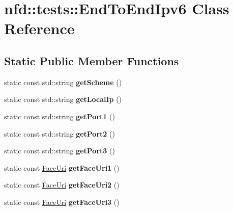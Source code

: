 \hypertarget{classnfd_1_1tests_1_1EndToEndIpv6}{}\section{nfd\+:\+:tests\+:\+:End\+To\+End\+Ipv6 Class Reference}
\label{classnfd_1_1tests_1_1EndToEndIpv6}
\subsection*{Static Public Member Functions}
\begin{DoxyCompactItemize}
\item 
static const std\+::string {\bfseries get\+Scheme} ()\hypertarget{classnfd_1_1tests_1_1EndToEndIpv6_a64fd121887d76d23874ca014762f704a}{}\label{classnfd_1_1tests_1_1EndToEndIpv6_a64fd121887d76d23874ca014762f704a}

\item 
static const std\+::string {\bfseries get\+Local\+Ip} ()\hypertarget{classnfd_1_1tests_1_1EndToEndIpv6_aa56bf2f89171a00212ee128f346d142d}{}\label{classnfd_1_1tests_1_1EndToEndIpv6_aa56bf2f89171a00212ee128f346d142d}

\item 
static const std\+::string {\bfseries get\+Port1} ()\hypertarget{classnfd_1_1tests_1_1EndToEndIpv6_a39646e3c4d68928a57c43f036942a7ef}{}\label{classnfd_1_1tests_1_1EndToEndIpv6_a39646e3c4d68928a57c43f036942a7ef}

\item 
static const std\+::string {\bfseries get\+Port2} ()\hypertarget{classnfd_1_1tests_1_1EndToEndIpv6_a8f7a63209cfa8ee6abb0954f50f7967c}{}\label{classnfd_1_1tests_1_1EndToEndIpv6_a8f7a63209cfa8ee6abb0954f50f7967c}

\item 
static const std\+::string {\bfseries get\+Port3} ()\hypertarget{classnfd_1_1tests_1_1EndToEndIpv6_aaa60bba7050c32358ae397fa1f7fad5f}{}\label{classnfd_1_1tests_1_1EndToEndIpv6_aaa60bba7050c32358ae397fa1f7fad5f}

\item 
static const \hyperlink{classndn_1_1util_1_1FaceUri}{Face\+Uri} {\bfseries get\+Face\+Uri1} ()\hypertarget{classnfd_1_1tests_1_1EndToEndIpv6_ac97626b913def91915120ba71723a66a}{}\label{classnfd_1_1tests_1_1EndToEndIpv6_ac97626b913def91915120ba71723a66a}

\item 
static const \hyperlink{classndn_1_1util_1_1FaceUri}{Face\+Uri} {\bfseries get\+Face\+Uri2} ()\hypertarget{classnfd_1_1tests_1_1EndToEndIpv6_a93c2eeb676762ccdbae3816074c2dc64}{}\label{classnfd_1_1tests_1_1EndToEndIpv6_a93c2eeb676762ccdbae3816074c2dc64}

\item 
static const \hyperlink{classndn_1_1util_1_1FaceUri}{Face\+Uri} {\bfseries get\+Face\+Uri3} ()\hypertarget{classnfd_1_1tests_1_1EndToEndIpv6_aaf77f73c52902a9327951e2a067bfa54}{}\label{classnfd_1_1tests_1_1EndToEndIpv6_aaf77f73c52902a9327951e2a067bfa54}

\end{DoxyCompactItemize}


